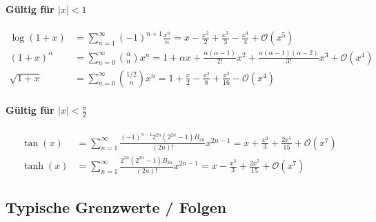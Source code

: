 \paragraph{Gültig für $|x|<1$}
\begin{align*}
        \log(1+x) &= \sum_{n=1}^{\infty}(-1)^{n+1}\frac{x^n}{n}
        = x-\frac{x^2}{2}+\frac{x^3}{3}-\frac{x^4}{4}+\mathcal{O}(x^5) \\
        (1+x)^\alpha &= \sum_{n=0}^{\infty}\binom{\alpha}{n}x^n
        = 1+\alpha x+\frac{\alpha(\alpha-1)}{2!}x^2+ \frac{\alpha(\alpha - 1)(\alpha - 2)}{3!}x^3 + \mathcal{O}(x^4) \\
        \sqrt{1+x} &= \sum_{n=0}^{\infty}\binom{1/2}{n}x^n
        = 1 + \frac{x}{2} - \frac{x^2}{8} + \frac{x^3}{16} - \mathcal{O}(x^4)
\end{align*}

\paragraph{Gültig für $|x|<\frac{\pi}{2}$}
\begin{align*}
        \tan(x) &= \sum_{n=1}^{\infty}\frac{(-1)^{n-1}2^{2n}(2^{2n}-1)B_{2n}}{(2n)!}x^{2n-1}
        = x+\frac{x^3}{3}+\frac{2x^5}{15}+\mathcal{O}(x^7) \\
        \tanh(x) &= \sum_{n=1}^{\infty}\frac{2^{2n}(2^{2n}-1)B_{2n}}{(2n)!}x^{2n-1}
        = x-\frac{x^3}{3}+\frac{2x^5}{15}+\mathcal{O}(x^7)
\end{align*}


\subsection{Typische Grenzwerte / Folgen}

